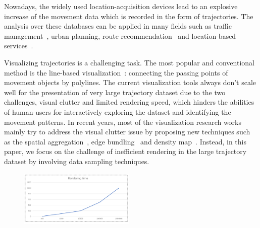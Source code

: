 Nowadays, the widely used location-acquisition devices lead to an explosive increase of the movement data which is recorded in the form of trajectories. 
The analysis over these databases can be applied in many fields such as traffic management~\cite{wang2014visual}, urban planning, route recommendation~\cite{zheng2011learning} and location-based services~\cite{liu2016smartadp, zheng2010collaborative}. 

Visualizing trajectories is a challenging task. The most popular and conventional method is the line-based visualization~\cite{chen2015survey}: connecting the passing points of movement objects by polylines. The current visualization tools always don't scale well for the presentation of very large trajectory dataset due to the two challenges, visual clutter and limited rendering speed, which hinders the abilities of human-users for interactively exploring the dataset and identifying the movement patterns. 
In recent years, most of the visualization research works mainly try to address the visual clutter issue by proposing new techniques such as the spatial aggregation~\cite{zeng2013visualizing, von2015mobilitygraphs}, edge bundling~\cite{zeng2019route, thony2015vector} and density map~\cite{lampe2011interactive, scheepens2011interactive}. Instead, in this paper, we focus on the challenge of inefficient rendering in the large trajectory dataset by involving data sampling techniques. 



\begin{figure}[t]
	\centering
	\includegraphics[width=0.49\textwidth]{pictures/introduction/rendering.png}
	\vspace{-5mm}
	\caption{ }
	\vspace{-5mm}
	\label{fig:rendering_time}
\end{figure}


